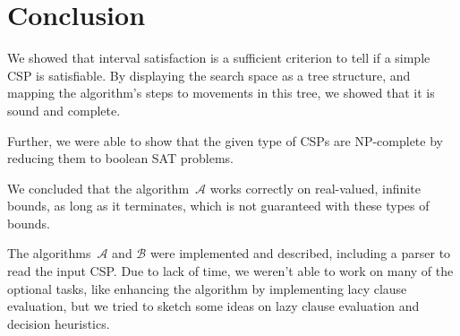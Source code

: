\section{Conclusion}\label{sec:conclusion}

We showed that interval satisfaction is a sufficient criterion to tell if a simple CSP is satisfiable.
By displaying the search space as a tree structure, and mapping the algorithm's steps to movements in this tree, we showed that it is sound and complete.

Further, we were able to show that the given type of CSPs are NP-complete by reducing them to boolean SAT problems.

We concluded that the algorithm~$\mathcal{A}$ works correctly on real-valued, infinite bounds, as long as it terminates, which is not guaranteed with these types of bounds.

The algorithms~$\mathcal{A}$ and $\mathcal{B}$ were implemented and described, including a parser to read the input CSP. Due to lack of time, we weren't able to work on many of the optional tasks, like enhancing the algorithm by implementing lacy clause evaluation, but we tried to sketch some ideas on lazy clause evaluation and decision heuristics.
